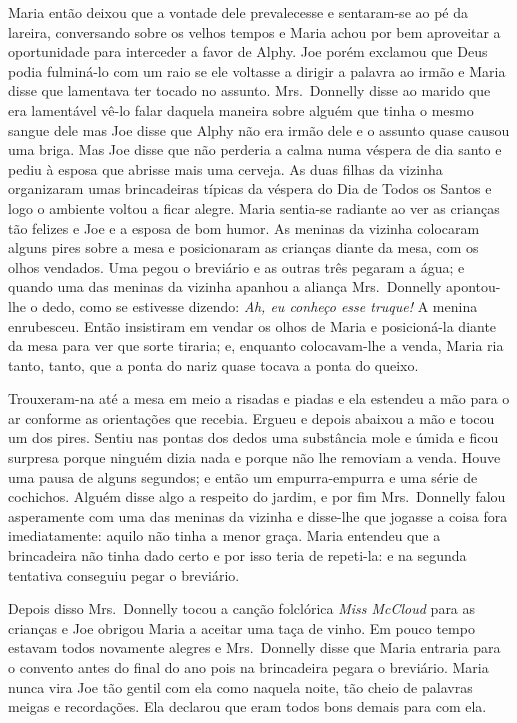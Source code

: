 Maria então deixou que a vontade dele prevalecesse e sentaram-se ao pé da
lareira, conversando sobre os velhos tempos e Maria achou por bem aproveitar a
oportunidade para interceder a favor de Alphy.  Joe porém exclamou que Deus
podia fulminá-lo com um raio se ele voltasse a dirigir a palavra ao irmão e
Maria disse que lamentava ter tocado no assunto.  Mrs.~Donnelly disse ao marido
que era lamentável vê-lo falar daquela maneira sobre alguém que tinha o mesmo
sangue dele mas Joe disse que Alphy não era irmão dele e o assunto quase causou
uma briga.  Mas Joe disse que não perderia a calma numa véspera de dia santo e
pediu à esposa que abrisse mais uma cerveja.  As duas filhas da vizinha
organizaram umas brincadeiras típicas da véspera do Dia de Todos os Santos e
logo o ambiente voltou a ficar alegre.  Maria sentia-se radiante ao ver as
crianças tão felizes e Joe e a esposa de bom humor.  As meninas da vizinha
colocaram alguns pires sobre a mesa e posicionaram as crianças diante da mesa,
com os olhos vendados.  Uma pegou o breviário e as outras três pegaram a água;
e quando uma das meninas da vizinha apanhou a aliança Mrs.~Donnelly apontou-lhe
o dedo, como se estivesse dizendo: \textit{Ah, eu conheço esse truque!}  A
menina enrubesceu.  Então insistiram em vendar os olhos de Maria e posicioná-la
diante da mesa para ver que sorte tiraria; e, enquanto colocavam-lhe a venda,
Maria ria tanto, tanto, que a ponta do nariz quase tocava a ponta do queixo.

Trouxeram-na até a mesa em meio a risadas e piadas e ela estendeu a mão
para o ar conforme as orientações que recebia.  Ergueu e depois abaixou a mão e
tocou um dos pires.  Sentiu nas pontas dos dedos uma substância mole e úmida e
ficou surpresa porque ninguém dizia nada e porque não lhe removiam a venda.
Houve uma pausa de alguns segundos; e então um empurra-empurra e uma série de
cochichos.  Alguém disse algo a respeito do jardim, e por fim Mrs.~Donnelly
falou asperamente com uma das meninas da vizinha e disse-lhe que jogasse a
coisa fora imediatamente: aquilo não tinha a menor graça.  Maria entendeu que a
brincadeira não tinha dado certo e por isso teria de repeti-la: e na segunda
tentativa conseguiu pegar o breviário.

Depois disso Mrs.~Donnelly tocou a canção folclórica \textit{Miss McCloud} para
as crianças e Joe obrigou Maria a aceitar uma taça de vinho.  Em pouco tempo
estavam todos novamente alegres e Mrs.~Donnelly disse que Maria entraria para o
convento antes do final do ano pois na brincadeira pegara o breviário.  Maria
nunca vira Joe tão gentil com ela como naquela noite, tão cheio de palavras
meigas e recordações.  Ela declarou que eram todos bons demais para com ela.


